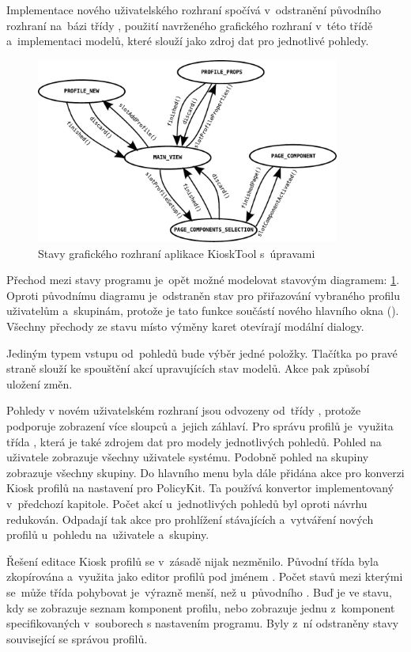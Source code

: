 Implementace nového uživatelského rozhraní spočívá v~odstranění původního rozhraní na~bázi třídy , použití navrženého grafického rozhraní v~této třídě a~implementaci modelů, které slouží jako zdroj dat pro jednotlivé pohledy.

\begin{figure}[h]
    \centering
    \includegraphics[width=10cm]{obrazky/stated-new.pdf}
    \caption{Stavy grafického rozhraní aplikace KioskTool s~úpravami}
    \label{fig:kioskstatesnew}
\end{figure}

Přechod mezi stavy programu je~opět možné modelovat stavovým diagramem: \ref{fig:kioskstatesnew}. Oproti původnímu diagramu je~odstraněn stav pro přiřazování vybraného profilu uživatelům a~skupinám, protože je tato funkce součástí nového hlavního okna (). Všechny přechody ze stavu  místo výměny karet otevírají modální dialogy.

Jediným typem vstupu od~pohledů bude výběr jedné položky. Tlačítka po pravé straně slouží ke spouštění akcí upravujících stav modelů. Akce  pak způsobí uložení změn.

Pohledy v novém uživatelském rozhraní jsou odvozeny od~třídy , protože podporuje zobrazení více sloupců a~jejich záhlaví. Pro správu profilů je~využita třída , která je také zdrojem dat pro modely jednotlivých pohledů. Pohled na uživatele zobrazuje všechny uživatele systému. Podobně pohled na skupiny zobrazuje všechny skupiny. Do hlavního menu byla dále přidána akce pro konverzi Kiosk profilů na nastavení pro PolicyKit. Ta používá konvertor implementovaný v~předchozí kapitole. Počet akcí u~jednotlivých pohledů byl oproti návrhu redukován. Odpadají tak akce pro prohlížení stávajících a~vytváření nových profilů u~pohledu na~uživatele a~skupiny.

Řešení editace Kiosk profilů se v~zásadě nijak nezměnilo. Původní třída  byla zkopírována a~využita jako editor profilů pod jménem . Počet stavů mezi kterými se~může třída pohybovat je~výrazně menší, než u~původního . Buď je ve stavu, kdy se zobrazuje seznam komponent profilu, nebo zobrazuje jednu z~komponent specifikovaných v~souborech s nastavením programu. Byly z~ní odstraněny stavy související se správou profilů.

